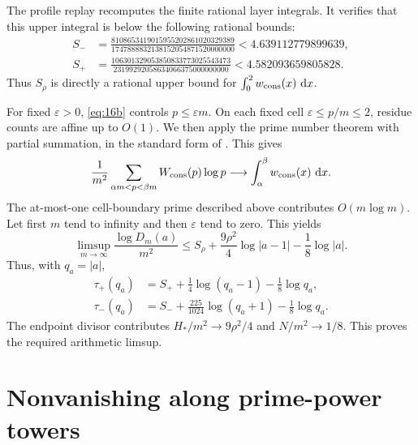 The profile replay recomputes the finite rational layer integrals. It verifies
that this upper integral is below the following rational bounds:
\begin{equation}
 \begin{aligned}
 S_-&=\frac{8108653419015955202861020329389}
 {1747888832138152054871520000000}<4.639112779899639,\\
 S_+&=\frac{106301329053850833773025543473}
 {23199292058634066375000000000}<4.582093659805828.
 \end{aligned}                                                \label{eq:13}
\end{equation}
Thus $S_\rho$ is directly a rational upper bound for
$\int_0^2w_{\rm cons}(x)\,\,\mathrm d x$.

For fixed $\varepsilon>0$, \eqref{eq:16b} controls
$p\le\varepsilon m$. On each fixed cell
$\varepsilon\le p/m\le2$, residue counts are affine up to $O(1)$. We then
apply the prime number theorem with partial summation, in the standard form
of \cite{Davenport}. This gives
\begin{equation}
 \frac1{m^2}\sum_{\alpha m<p<\beta m}
 W_{\rm cons}(p)\log p
 \longrightarrow\int_\alpha^\beta w_{\rm cons}(x)\,\,\mathrm d x. \label{eq:14}
\end{equation}
The at-most-one cell-boundary prime described above contributes
$O(m\log m)$. Let first $m$ tend to infinity
and then $\varepsilon$ tend to zero. This yields
\begin{equation}
 \limsup_{m\to\infty}\frac{\log D_m(a)}{m^2}
 \le S_\rho+\frac{9\rho^2}{4}\log|a-1|
                  -\frac18\log|a|.                        \label{eq:15}
\end{equation}
Thus, with $q_a=|a|$,
\begin{equation}
\begin{aligned}
 \tau_+(q_a)&=S_++\frac14\log(q_a-1)-\frac18\log q_a,\\
 \tau_-(q_a)&=S_-+\frac{225}{1024}\log(q_a+1)-\frac18\log q_a.
\end{aligned}                                               \label{eq:17}
\end{equation}
The endpoint divisor contributes $H_*/m^2\to9\rho^2/4$ and
$N/m^2\to1/8$. This proves the required arithmetic limsup.

\section{Nonvanishing along prime-power towers}\label{sec:nonvanishing}

